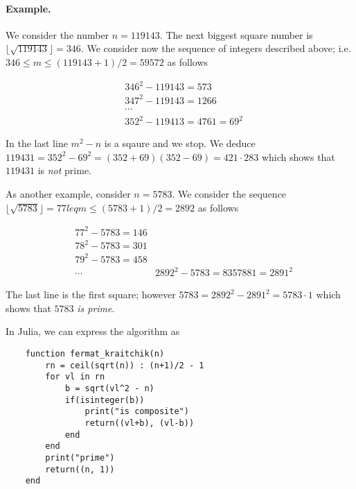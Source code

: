 \paragraph{Example.} We consider the number $n = 119143$. The next biggest square number is $\lfloor \sqrt{119143} \rfloor = 346$. We consider now the sequence of integers described above; i.e. $346 \leq m \leq (119143+1)/2 = 59572$ as follows

\begin{align*}
    &346^2 - 119143 = 573 \\
    &347^2 - 119143 = 1266 \\
    & \cdots \\
    &352^2 - 119413 = 4761 = 69^2
\end{align*}

In the last line $m^2 - n$ is a sqaure and we stop. We deduce $119431 = 352^2 - 69^2 = (352+69)(352-69) = 421 \cdot 283$ which shows that $119431$ is \emph{not} prime.

As another example, consider $n= 5783$. We consider the sequence $\lfloor \sqrt{5783} \rfloor = 77 leq m \leq (5783+1)/2 = 2892$ as follows

\begin{align*}
    &77^2 - 5783 = 146 \\
    &78^2 - 5783 = 301 \\
    &79^2 - 5783 = 458 \\
    & \cdots
    & 2892^2 - 5783 = 8357881 = 2891^2
\end{align*}

The last line is the first square; however $5783 = 2892^2 - 2891^2 = 5783 \cdot 1$ which shows that $5783$ \emph{is prime}.

In Julia, we can express the algorithm as

\begin{verbatim}
    function fermat_kraitchik(n)
        rn = ceil(sqrt(n)) : (n+1)/2 - 1
        for vl in rn
            b = sqrt(vl^2 - n)
            if(isinteger(b))
                print("is composite")
                return((vl+b), (vl-b))
            end
        end
        print("prime")
        return((n, 1))
    end
\end{verbatim}


